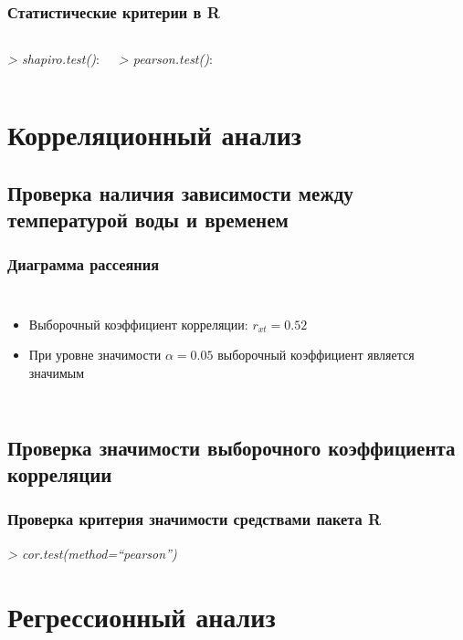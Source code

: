 \documentclass[10pt,pdf,aspectratio=169]{beamer}
\begin{document}
\begin{frame}
  \frametitle{Статистические критерии в R}   %
   \begin{columns}[c]
   \column{2.2in}
   \textit{> shapiro.test()}:
   
   \column{2in}
  \textit{> pearson.test()}:
   
  \end{columns}
\end{frame}


\section{Корреляционный анализ}

\subsection{Проверка наличия зависимости между температурой воды и временем}
\begin{frame}
  \frametitle{Диаграмма рассеяния}   %
  \begin{columns}[c]
  \column{2in}  %
  \begin{itemize}
  \item<1-> Выборочный коэффициент корреляции: $r_{xt}=0.52$
  \item<2-> При уровне значимости $\alpha=0.05$ выборочный коэффициент является значимым
  \end{itemize}
  \column{3in}
  \end{columns}
\end{frame}

\subsection{Проверка значимости выборочного коэффициента корреляции}
\begin{frame}
  \frametitle{Проверка критерия значимости средствами пакета R}   %
  \textit{> cor.test(method=``pearson'')}
   
\end{frame}

\section{Регрессионный анализ}
\end{document}
